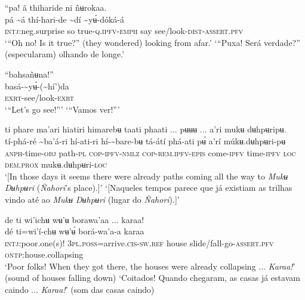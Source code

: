 \documentclass[output=paper,
modfonts,nonflat
]{langsci/langscibook}
\begin{document}
 
\ea “pa! ã thiharide ni ñʉrokaa. \\[.3em]
\gll pá	{\textasciitilde}á	thí-hari-de	{\textasciitilde}dí	{\textasciitilde}yʉ́-dóká-á \\
     \textsc{intj:}neg.surprise	so	true-\textsc{q.ipfv-emph}	say	see/look-\textsc{dist}-\textsc{assert.pfv} \\
\glt ‘“Oh no! Is it true?” (they wondered) looking from afar.'
\glt ‘“Puxa! Será verdade?” (especularam) olhando de longe.'
\z 

\ea “bahsañʉna!”  \\[.3em]
\gll basá-{\textasciitilde}yʉ́-({\textasciitilde}hí')da \\
     \textsc{exrt}-see/look-\textsc{exrt}{\footnotemark} \\
\glt ‘“Let's go see!”'
\glt ‘“Vamos ver!”' 
\z 

\ea ti phare ma'ari hiatiri himarebʉ taati phaati ... pʉʉʉ ... a’ri mukʉ dʉhpʉripʉ. \\[.3em]
\gll tí-phá-ré	{\textasciitilde}ba'á-ri	hí-ati-ri	hí-{\textasciitilde}bare-bʉ tá-átí	phá-ati	pʉ́	a’rí	múkʉ.dʉhpʉri-pʉ \\
     \textsc{anph}-time\textsc{-obj}	path-\textsc{pl}	\textsc{cop-ipfv-nmlz}	\textsc{cop-rem.ipfv-epis} come-\textsc{ipfv}	time-\textsc{ipfv}	\textsc{loc}	\textsc{dem.prox}	mukʉ.dʉhpʉri-\textsc{loc} \\
\glt ‘[In those days it seems there were already paths coming all the way to \textit{Mukʉ Dʉhpʉri} (\textit{Ñahori}’s place).]’
\glt ‘[Naqueles tempos parece que já existiam as trilhas vindo até ao \textit{Mukʉ Dʉhpʉri} (lugar do \textit{Ñahori}).]’
\z 

\ea de ti wi'ichʉ wʉ'ʉ borawa'aa ... karaa! \\[.3em]
\gll dé	ti=wi'í-chʉ	wʉ'ʉ́	borá-wa'a-a	karaa \\
     \textsc{intj:}poor.one(s)!	3\textsc{pl.poss}=arrive\textsc{.cis-sw.ref}	house	slide/fall-go-\textsc{assert.pfv}	\textsc{ontp:}house.collapsing \\
\glt ‘Poor folks! When they got there, the houses were already collapsing ... \textit{Karaa!}’ (sound of houses falling down)
\glt ‘Coitados! Quando chegaram, as casas já estavam caindo ... \textit{Karaa!}’ (som das casas caindo)
\z 
\end{document}
